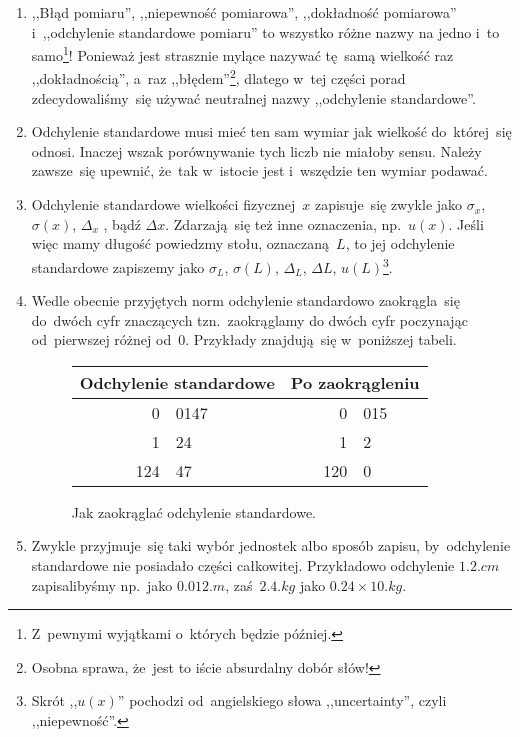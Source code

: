 \documentclass[a4paper,11pt]{article}
\begin{document}
\begin{enumerate}
\item ,,Błąd pomiaru'', ,,niepewność pomiarowa'', ,,dokładność
  pomiarowa'' i~,,odchylenie standardowe pomiaru'' to wszystko różne
  nazwy na jedno i~to samo\footnote{Z~pewnymi wyjątkami o~których
    będzie później.}! Ponieważ jest strasznie mylące nazywać tę~samą
  wielkość raz ,,dokładnością'', a~raz ,,błędem''\footnote{Osobna
    sprawa, że~jest to iście absurdalny dobór słów!}, dlatego w~tej
  części porad zdecydowaliśmy~się używać neutralnej nazwy ,,odchylenie
  standardowe''.

\item Odchylenie standardowe musi mieć ten sam wymiar jak wielkość
  do~której~się odnosi. Inaczej wszak porównywanie tych liczb nie
  miałoby sensu. Należy zawsze~się upewnić, że~tak w~istocie jest
  i~wszędzie ten wymiar podawać.

\item Odchylenie standardowe wielkości fizycznej~$x$ zapisuje~się
  zwykle jako $\sigma_{ x }$, $\sigma( x )$, $\Delta_{ x }$ , bądź
  $\Delta x$. Zdarzają~się też inne oznaczenia, np.~$u( x )$. Jeśli
  więc mamy długość powiedzmy stołu, oznaczaną~$L$, to jej odchylenie
  standardowe zapiszemy jako $\sigma_{ L }$, $\sigma( L )$,
  $\Delta_{ L }$, $\Delta L$, $u( L )$\footnote{Skrót ,,$u( x )$''
    pochodzi od~angielskiego słowa ,,uncertainty'', czyli
    ,,niepewność''.}.

\item Wedle obecnie przyjętych norm odchylenie standardowo
  zaokrągla~się do~dwóch cyfr znaczących tzn.~zaokrąglamy do dwóch
  cyfr poczynając od~pierwszej różnej od~0. Przykłady znajdują~się
  w~poniższej tabeli.
  \begin{figure}[h]
    \centering
    \begin{tabular}[h]{|r @{.} l |r @{.} l|}
      \hline
      \multicolumn{2}{|c}{Odchylenie standardowe}
      & \multicolumn{2}{|c|}{Po zaokrągleniu} \\
      \hline
      0&0147 & 0&015 \\
      1&24   & 1&2 \\
      124&47 & 120&0 \\
      \hline
    \end{tabular}
    \caption{Jak zaokrąglać odchylenie standardowe.}
    \label{fig:odchylenie}
  \end{figure}

\item Zwykle przyjmuje~się taki wybór jednostek albo sposób zapisu,
  by~odchylenie standardowe nie posiadało części całkowitej.
  Przykładowo odchylenie $1.2 \si{.cm}$ zapisalibyśmy np.~jako
  $0.012 \si{.m}$, zaś~$2.4 \si{.kg}$ jako $0.24 \times 10 \si{.kg}$.


\end{enumerate}
\end{document}
